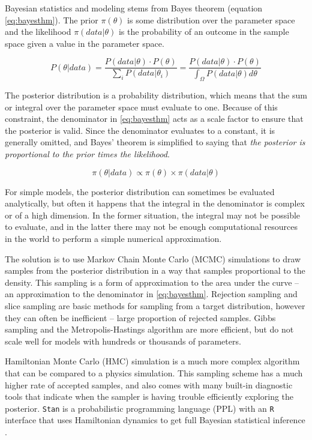 \documentclass[11pt, oneside, openany]{scrbook}
\begin{document}
Bayesian statistics and modeling stems from Bayes theorem (equation \eqref{eq:bayesthm}). The prior \(\pi(\theta)\) is some distribution over the parameter space and the likelihood \(\pi(data | \theta)\) is the probability of an outcome in the sample space given a value in the parameter space.

\begin{equation}
  P(\theta | data) = \frac{P(data | \theta)\cdot P(\theta)}{\sum_i P(data | \theta_i)} =   \frac{P(data | \theta)\cdot P(\theta)}{\int_\Omega P(data | \theta)d\theta}
  \label{eq:bayesthm}
\end{equation}

The posterior distribution is a probability distribution, which means that the sum or integral over the parameter space must evaluate to one. Because of this constraint, the denominator in \eqref{eq:bayesthm} acts as a scale factor to ensure that the posterior is valid. Since the denominator evaluates to a constant, it is generally omitted, and Bayes' theorem is simplified to saying that \emph{the posterior is proportional to the prior times the likelihood}.

\[\pi(\theta \vert data) \propto \pi(\theta) \times \pi(data \vert \theta)\]

For simple models, the posterior distribution can sometimes be evaluated analytically, but often it happens that the integral in the denominator is complex or of a high dimension. In the former situation, the integral may not be possible to evaluate, and in the latter there may not be enough computational resources in the world to perform a simple numerical approximation.

The solution is to use Markov Chain Monte Carlo (MCMC) simulations to draw samples from the posterior distribution in a way that samples proportional to the density. This sampling is a form of approximation to the area under the curve -- an approximation to the denominator in \eqref{eq:bayesthm}. Rejection sampling \citep{gilks1992adaptive} and slice sampling \citep{neal2003slice} are basic methods for sampling from a target distribution, however they can often be inefficient -- large proportion of rejected samples. Gibbs sampling and the Metropolis-Hastings algorithm are more efficient, but do not scale well for models with hundreds or thousands of parameters.

Hamiltonian Monte Carlo (HMC) simulation is a much more complex algorithm that can be compared to a physics simulation. This sampling scheme has a much higher rate of accepted samples, and also comes with many built-in diagnostic tools that indicate when the sampler is having trouble efficiently exploring the posterior. \texttt{Stan} is a probabilistic programming language (PPL) with an \texttt{R} interface that uses Hamiltonian dynamics to get full Bayesian statistical inference \citep{R-rstan}.
\end{document}
